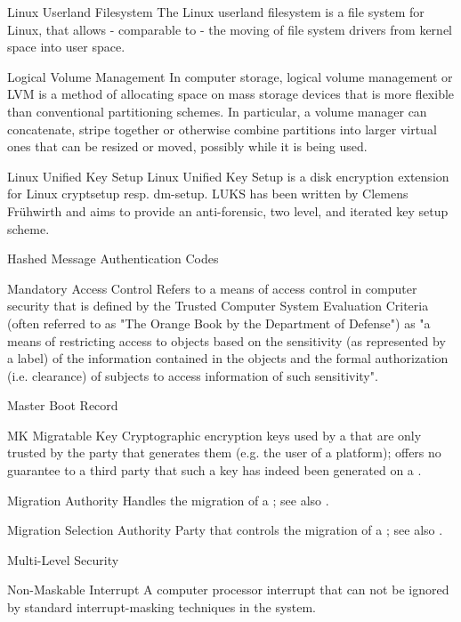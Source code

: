     {Linux Userland Filesystem}
    {The Linux userland filesystem is a file system for Linux, that allows - comparable to \FUSE - the moving of file system drivers from kernel space into user space.}

    {Logical Volume Management}
    {In computer storage, logical volume management or LVM is a method of allocating space on mass storage devices that is more flexible than conventional partitioning schemes. In particular, a volume manager can concatenate, stripe together or otherwise combine partitions into larger virtual ones that can be resized or moved, possibly while it is being used.}

    {Linux Unified Key Setup}
    {Linux Unified Key Setup is a disk encryption extension for Linux cryptsetup resp. dm-setup. LUKS has been written by Clemens Fr\"uhwirth and aims to provide an anti-forensic, two level, and iterated key setup scheme.}

    {Hashed Message Authentication Codes}

    {Mandatory Access Control}
    {Refers to a means of access control in computer security that is defined by
the Trusted Computer System Evaluation Criteria (often referred to as "The Orange Book by the Department of Defense") as "a means of restricting
access to objects based on the sensitivity (as represented by a label) of the
information contained in the objects and the formal authorization (i.e.
clearance) of subjects to access information of such sensitivity".}

    {Master Boot Record}

\glosentry
    {MK}
    {Migratable Key}
    {Cryptographic encryption keys used by a \TPM that are only trusted by the
party that generates them (e.g. the user of a platform); offers no guarantee to
a third party that such a key has indeed been generated on a \TPM.}

    {Migration Authority}
    {Handles the migration of a \CMK; see also \MSA.}

    {Migration Selection Authority}
    {Party that controls the migration of a \CMK; see also \MA.}

    {Multi-Level Security}

    {Non-Maskable Interrupt}
    {A computer processor interrupt that can not be ignored by standard
interrupt-masking techniques in the system.}

